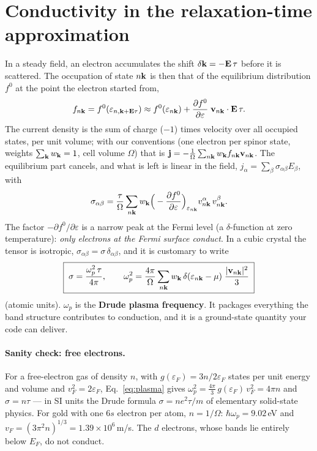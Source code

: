 \section{Conductivity in the relaxation-time approximation}

In a steady field, an electron accumulates the shift $\delta\mathbf{k} = -\mathbf
E\,\tau$ before it is scattered. The occupation of state $n\mathbf{k}$ is then
that of the equilibrium distribution $f^0$ at the point the electron
started from,
\begin{equation}
f_{n\mathbf{k}} = f^0(\varepsilon_{n,\mathbf{k}+\mathbf E\tau})
\approx f^0(\varepsilon_{n\mathbf{k}})
+ \frac{\partial f^0}{\partial \varepsilon}\;\mathbf v_{n\mathbf{k}}\cdot\mathbf E\,\tau .
\end{equation}
The current density is the sum of charge ($-1$) times velocity over all
occupied states, per unit volume; with our conventions (one electron per
spinor state, weights $\sum_{\mathbf{k}} w_{\mathbf{k}} = 1$, cell volume $\Omega$) that is
$\mathbf j = -\frac{1}{\Omega}\sum_{n\mathbf{k}}w_{\mathbf{k}} f_{n\mathbf{k}}\mathbf v_{n\mathbf{k}}$.
The equilibrium part cancels, and what is left is linear in the field,
$j_\alpha = \sum_\beta\sigma_{\alpha\beta}E_\beta$, with
\begin{equation}
\sigma_{\alpha\beta} = \frac{\tau}{\Omega}\sum_{n\mathbf{k}} w_{\mathbf{k}}
\Big(-\frac{\partial f^0}{\partial \varepsilon}\Big)_{\varepsilon_{n\mathbf{k}}}
v^\alpha_{n\mathbf{k}}\,v^\beta_{n\mathbf{k}} .
\label{eq:sigmatensor}
\end{equation}
The factor $-\partial f^0/\partial\varepsilon$ is a narrow peak at the
Fermi level (a $\delta$-function at zero temperature): \emph{only
electrons at the Fermi surface conduct}. In a cubic crystal the tensor is
isotropic, $\sigma_{\alpha\beta} = \sigma\,\delta_{\alpha\beta}$, and it is
customary to write
\begin{equation}
\boxed{\;
\sigma = \frac{\omega_p^2\,\tau}{4\pi},
\qquad
\omega_p^2 = \frac{4\pi}{\Omega}\sum_{n\mathbf{k}} w_{\mathbf{k}}\,
\delta(\varepsilon_{n\mathbf{k}}-\mu)\;\frac{|\mathbf v_{n\mathbf{k}}|^2}{3}\;}
\label{eq:plasma}
\end{equation}
(atomic units). $\omega_p$ is the \textbf{Drude plasma frequency}. It
packages everything the band structure contributes to conduction, and it
is a ground-state quantity your code can deliver.

\paragraph{Sanity check: free electrons.} For a free-electron gas of density
$n$, with $g(\varepsilon_F) = 3n/2\varepsilon_F$ states per unit energy
and volume and $v_F^2 = 2\varepsilon_F$, Eq.~\eqref{eq:plasma} gives
$\omega_p^2 = \tfrac{4\pi}{3}\,g(\varepsilon_F)\,v_F^2 = 4\pi n$ and
$\sigma = n\tau$ --- in SI units the Drude formula $\sigma = ne^2\tau/m$
of elementary solid-state physics. For gold with one $6s$ electron per
atom, $n = 1/\Omega$: $\hbar\omega_p = 9.02$\,eV and
$v_F = (3\pi^2 n)^{1/3} = 1.39\times10^6$\,m/s. The $d$ electrons, whose
bands lie entirely below $E_F$, do not conduct.

